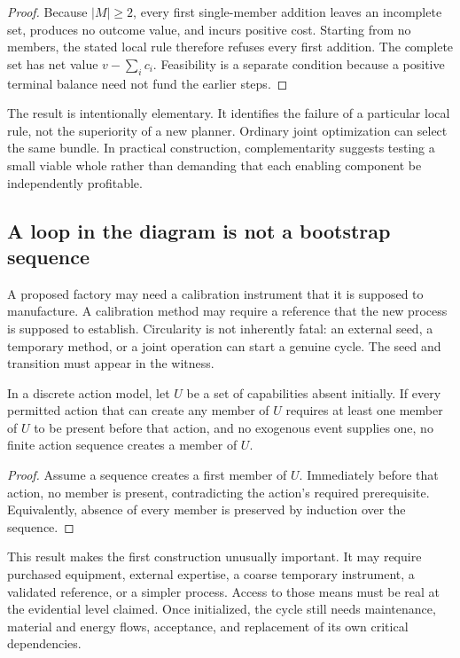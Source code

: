 \begin{proof}
Because $|M|\ge2$, every first single-member addition leaves an incomplete set, produces no outcome value, and incurs positive cost. Starting from no members, the stated local rule therefore refuses every first addition. The complete set has net value $v-\sum_i c_i$. Feasibility is a separate condition because a positive terminal balance need not fund the earlier steps.
\end{proof}

The result is intentionally elementary. It identifies the failure of a particular local rule, not the superiority of a new planner. Ordinary joint optimization can select the same bundle. In practical construction, complementarity suggests testing a small viable whole rather than demanding that each enabling component be independently profitable.

\subsection{A loop in the diagram is not a bootstrap sequence}

A proposed factory may need a calibration instrument that it is supposed to manufacture. A calibration method may require a reference that the new process is supposed to establish. Circularity is not inherently fatal: an external seed, a temporary method, or a joint operation can start a genuine cycle. The seed and transition must appear in the witness.

\begin{proposition}
\label{prop:bootstrap}
In a discrete action model, let $U$ be a set of capabilities absent initially. If every permitted action that can create any member of $U$ requires at least one member of $U$ to be present before that action, and no exogenous event supplies one, no finite action sequence creates a member of $U$.
\end{proposition}

\begin{proof}
Assume a sequence creates a first member of $U$. Immediately before that action, no member is present, contradicting the action's required prerequisite. Equivalently, absence of every member is preserved by induction over the sequence.
\end{proof}

This result makes the first construction unusually important. It may require purchased equipment, external expertise, a coarse temporary instrument, a validated reference, or a simpler process. Access to those means must be real at the evidential level claimed. Once initialized, the cycle still needs maintenance, material and energy flows, acceptance, and replacement of its own critical dependencies.

